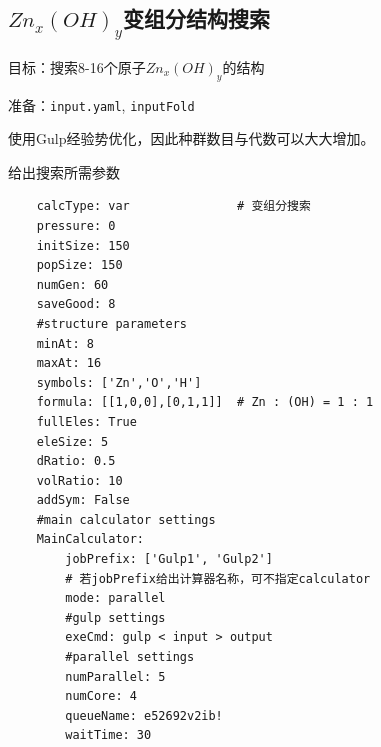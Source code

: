 \documentclass[12pt]{article}
\newcommand{\file}[1]{\texttt{#1}}
\begin{document}
\subsection{\texorpdfstring{$Zn_x(OH)_y$变组分结构搜索}{ZnOH变组分结构搜索}}
目标：搜索8-16个原子$Zn_x(OH)_y$的结构\par
准备：\file{input.yaml}, \file{inputFold}\par
使用Gulp经验势优化，因此种群数目与代数可以大大增加。
\begin{tcolorbox}[enhanced, breakable, title = {\file{input.yaml}}]
    给出搜索所需参数
    \tcblower
    \begin{verbatim}
    calcType: var               # 变组分搜索
    pressure: 0
    initSize: 150 
    popSize: 150 
    numGen: 60
    saveGood: 8
    #structure parameters
    minAt: 8
    maxAt: 16
    symbols: ['Zn','O','H']
    formula: [[1,0,0],[0,1,1]]  # Zn : (OH) = 1 : 1
    fullEles: True
    eleSize: 5
    dRatio: 0.5 
    volRatio: 10
    addSym: False
    #main calculator settings
    MainCalculator:
        jobPrefix: ['Gulp1', 'Gulp2']  
        # 若jobPrefix给出计算器名称，可不指定calculator                                                 
        mode: parallel
        #gulp settings
        exeCmd: gulp < input > output
        #parallel settings
        numParallel: 5
        numCore: 4
        queueName: e52692v2ib!
        waitTime: 30
    \end{verbatim}
    \end{tcolorbox}
\end{document}
